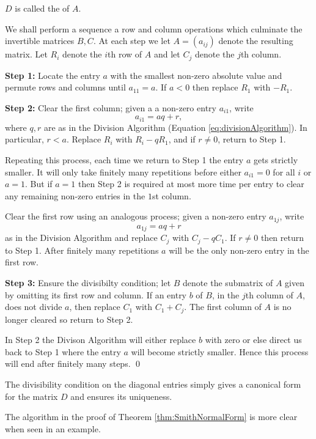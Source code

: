 \documentclass[../algebraNotesMSRI-UP2016.tex]{subfiles}
\begin{document}
\begin{frame}{}{}
$D$ is called the  of $A$.

\bigProof
We shall perform a sequence a row and column operations which culminate the invertible matrices $B,C$.  At each step we let $A=(a_{ij})$ denote the resulting matrix.  Let $R_i$ denote the $i$th row of $A$ and let $C_j$ denote the $j$th column.    

\smallGap
\textbf{Step 1:} Locate the entry $a$ with the smallest non-zero absolute value and permute rows and columns until $a_{11}=a$.  If $a<0$ then replace $R_1$ with $-R_1$.  

\smallGap
\textbf{Step 2:} Clear the first column; given a a non-zero entry $a_{i1}$, write 
\[
a_{i1}= aq+r,
\]  
where $q,r$ are as in the Division Algorithm (Equation \eqref{eq:divisionAlgorithm}).  In particular, $r<a$.  Replace $R_i$ with $R_i-qR_1$, and if $r\neq 0$, return to Step 1.  
\end{frame}

\begin{frame}
Repeating this process, each time we return to Step 1 the entry $a$ gets strictly smaller.  It will only take finitely many repetitions before either $a_{i1}=0$ for all $i$ or $a=1$.  But if $a=1$ then Step 2 is required at most more time per entry to clear any remaining non-zero entries in the $1$st column.  

\smallGap
Clear the first row using an analogous process; given a non-zero entry $a_{1j}$, write
\[
a_{1j}=aq+r
\]
as in the Division Algorithm and replace $C_j$ with $C_j-qC_1$.  If $r\neq 0$ then return to Step 1.  After finitely many repetitions $a$ will be the only non-zero entry in the first row.

\smallGap
\textbf{Step 3:} Ensure the divisibilty condition; let $B$ denote the submatrix of $A$ given by omitting its first row and column.  If an entry $b$ of $B$, in the $j$th column of $A$, does not divide $a$, then replace $C_1$ with $C_1+C_j$.  The first column of $A$ is no longer cleared so return to Step 2.
\end{frame}

\begin{frame}[c]
In Step 2 the Divison Algorithm will either replace $b$ with zero or else direct us back to Step 1 where the entry $a$ will become strictly smaller.  Hence this process will end after finitely many steps.
\qed

\smallGap
The divisibility condition on the diagonal entries simply gives a canonical form for the matrix $D$ and ensures its uniqueness.

\smallGap 
The algorithm in the proof of Theorem \ref{thm:SmithNormalForm} is more clear when seen in an example.
\end{frame}
\end{document}

